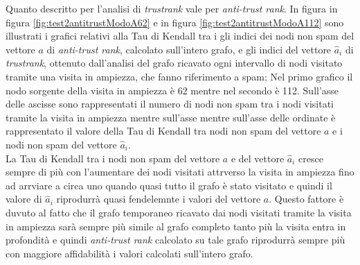 Quanto descritto per l'analisi di \textit{trustrank} vale per \textit{anti-trust rank}. In figura in figura \ref{fig:test2antitrustModoA62} e in figura \ref{fig:test2antitrustModoA112} sono illustrati i grafici relativi alla Tau di Kendall tra i gli indici dei nodi non spam del vettore \(a\) di \textit{anti-trust rank}, calcolato sull'intero grafo, e gli indici  del vettore \(\hat{a}_i\) di \textit{trustrank}, ottenuto dall'analisi del grafo ricavato ogni intervallo di nodi visitato tramite una visita in ampiezza, che fanno riferimento a spam; Nel primo grafico il nodo sorgente della visita in ampiezza è 62 mentre nel secondo è 112. Sull'asse delle ascisse sono rappresentati il numero di nodi non spam tra i nodi visitati tramite la visita in ampiezza mentre sull'asse mentre sull'asse delle ordinate è rappresentato il valore della Tau di Kendall tra nodi non spam del vettore \(a\) e i nodi non spam del vettore \(\hat{a}_i\).\\
La  Tau di Kendall tra i nodi non spam del vettore \(a\) e del vettore \(\hat{a}_i\) cresce sempre di più con l'aumentare dei nodi visitati attrverso la visita in ampiezza fino ad arrviare a circa uno quando quasi tutto il grafo è stato visitato e quindi il valore di \(\hat{a}_i\) riprodurrà quasi fendelemnte i valori del vettore \(a\). Questo fattore è duvuto al fatto che il grafo temporaneo ricavato dai nodi visitati tramite la visita in ampiezza sarà sempre più simile al grafo completo tanto più la visita entra in profondità e quindi \textit{anti-trust rank} calcolato su tale grafo riprodurrà sempre più con maggiore affidabilità i valori calcolati sull'intero grafo.


